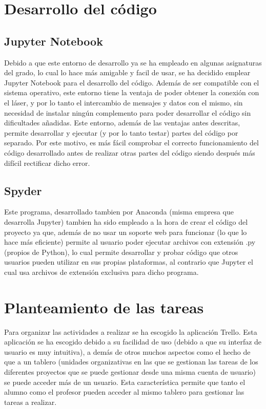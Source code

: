 \section{Desarrollo del código}

\subsection{Jupyter Notebook}

Debido a que este entorno de desarrollo ya se ha empleado en algunas asignaturas del grado, lo cual lo hace más amigable y facil de usar, se ha decidido emplear Jupyter Notebook para el desarrollo del código. Además de ser compatible con el sistema operativo, este entorno tiene la ventaja de poder obtener la conexión con el láser, y por lo tanto el intercambio de mensajes y datos con el mismo, sin necesidad de instalar ningún complemento para poder desarrollar el código sin dificultades añadidas.
Este entorno, además de las ventajas antes descritas, permite desarrollar y ejecutar (y por lo tanto testar) partes del código por separado. Por este motivo, es más fácil comprobar el correcto funcionamiento del código desarrollado antes de realizar otras partes del código siendo después más difícil rectificar dicho error.

\subsection{Spyder}

Este programa, desarrollado tambien por Anaconda (misma empresa que desarrolla Jupyter) tambien ha sido empleado a la hora de crear el código del proyecto ya que, además de no usar un soporte web para funcionar (lo que lo hace más eficiente) permite al usuario poder ejecutar archivos con extensión .py (propios de Python), lo cual permite desarrollar y probar código que otros usuarios pueden utilizar en sus propias plataformas, al contrario que Jupyter el cual usa archivos de extensión exclusiva para dicho programa.

\section{Planteamiento de las tareas}

Para organizar las actividades a realizar se ha escogido la aplicación Trello. Esta aplicación se ha escogido debido a su facilidad de uso (debido a que su interfaz de usuario es muy intuitiva), a demás de otros muchos aspectos como el hecho de que a un tablero (unidades organizativas en las que se gestionan las tareas de los diferentes proyectos que se puede gestionar desde una misma cuenta de usuario) se puede acceder más de un usuario. Esta característica permite que tanto el alumno como el profesor pueden acceder al mismo tablero para gestionar las tareas a realizar.

